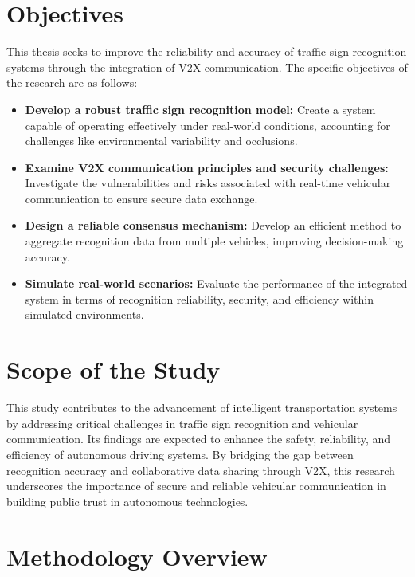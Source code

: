 \section{Objectives}

This thesis seeks to improve the reliability and accuracy of traffic sign recognition systems through the integration of V2X communication. The specific objectives of the research are as follows:

\begin{itemize}
    \item \textbf{Develop a robust traffic sign recognition model:} Create a system capable of operating effectively under real-world conditions, accounting for challenges like environmental variability and occlusions.
    \item \textbf{Examine V2X communication principles and security challenges:} Investigate the vulnerabilities and risks associated with real-time vehicular communication to ensure secure data exchange.
    \item \textbf{Design a reliable consensus mechanism:} Develop an efficient method to aggregate recognition data from multiple vehicles, improving decision-making accuracy.
    \item \textbf{Simulate real-world scenarios:} Evaluate the performance of the integrated system in terms of recognition reliability, security, and efficiency within simulated environments.
\end{itemize}

\section{Scope of the Study}

This study contributes to the advancement of intelligent transportation systems by addressing critical challenges in traffic sign recognition and vehicular communication. Its findings are expected to enhance the safety, reliability, and efficiency of autonomous driving systems. By bridging the gap between recognition accuracy and collaborative data sharing through V2X, this research underscores the importance of secure and reliable vehicular communication in building public trust in autonomous technologies.


\section{Methodology Overview}

